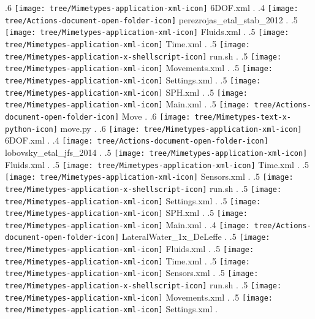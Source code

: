 {.6 { \texttt{[image: tree/Mimetypes-application-xml-icon]} 6DOF.xml }.
.4 { \texttt{[image: tree/Actions-document-open-folder-icon]} perezrojas\_etal\_stab\_2012 }.
.5 { \texttt{[image: tree/Mimetypes-application-xml-icon]} Fluids.xml }.
.5 { \texttt{[image: tree/Mimetypes-application-xml-icon]} Time.xml }.
.5 { \texttt{[image: tree/Mimetypes-application-x-shellscript-icon]} run.sh }.
.5 { \texttt{[image: tree/Mimetypes-application-xml-icon]} Movements.xml }.
.5 { \texttt{[image: tree/Mimetypes-application-xml-icon]} Settings.xml }.
.5 { \texttt{[image: tree/Mimetypes-application-xml-icon]} SPH.xml }.
.5 { \texttt{[image: tree/Mimetypes-application-xml-icon]} Main.xml }.
.5 { \texttt{[image: tree/Actions-document-open-folder-icon]} Move }.
.6 { \texttt{[image: tree/Mimetypes-text-x-python-icon]} move.py }.
.6 { \texttt{[image: tree/Mimetypes-application-xml-icon]} 6DOF.xml }.
.4 { \texttt{[image: tree/Actions-document-open-folder-icon]} lobovsky\_etal\_jfs\_2014 }.
.5 { \texttt{[image: tree/Mimetypes-application-xml-icon]} Fluids.xml }.
.5 { \texttt{[image: tree/Mimetypes-application-xml-icon]} Time.xml }.
.5 { \texttt{[image: tree/Mimetypes-application-xml-icon]} Sensors.xml }.
.5 { \texttt{[image: tree/Mimetypes-application-x-shellscript-icon]} run.sh }.
.5 { \texttt{[image: tree/Mimetypes-application-xml-icon]} Settings.xml }.
.5 { \texttt{[image: tree/Mimetypes-application-xml-icon]} SPH.xml }.
.5 { \texttt{[image: tree/Mimetypes-application-xml-icon]} Main.xml }.
.4 { \texttt{[image: tree/Actions-document-open-folder-icon]} LateralWater\_1x\_DeLeffe }.
.5 { \texttt{[image: tree/Mimetypes-application-xml-icon]} Fluids.xml }.
.5 { \texttt{[image: tree/Mimetypes-application-xml-icon]} Time.xml }.
.5 { \texttt{[image: tree/Mimetypes-application-xml-icon]} Sensors.xml }.
.5 { \texttt{[image: tree/Mimetypes-application-x-shellscript-icon]} run.sh }.
.5 { \texttt{[image: tree/Mimetypes-application-xml-icon]} Movements.xml }.
.5 { \texttt{[image: tree/Mimetypes-application-xml-icon]} Settings.xml }.
}
